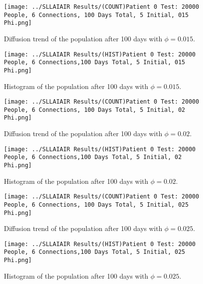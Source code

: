 \documentclass{article}
\numberwithin{equation}{section} %
\begin{document}
\begin{figure}[H]
  \centering
  \begin{minipage}{0.45\textwidth}
    \centering
    \texttt{[image: ../SLLAIAIR Results/(COUNT)Patient 0 Test: 20000 People, 6 Connections, 100 Days Total, 5 Initial, 015 Phi.png]} %
    \caption{Diffusion trend of the population after 100 days with $\phi = 0.015$.}
  \end{minipage}\hfill
  \begin{minipage}{0.45\textwidth}
    \centering
    \texttt{[image: ../SLLAIAIR Results/(HIST)Patient 0 Test: 20000 People, 6 Connections,100 Days Total, 5 Initial, 015 Phi.png]} %
    \caption{Histogram of the population after 100 days with $\phi = 0.015$.}
  \end{minipage}
\end{figure}

\begin{figure}[H]
  \centering
  \begin{minipage}{0.45\textwidth}
    \centering
    \texttt{[image: ../SLLAIAIR Results/(COUNT)Patient 0 Test: 20000 People, 6 Connections, 100 Days Total, 5 Initial, 02 Phi.png]} %
    \caption{Diffusion trend of the population after 100 days with $\phi = 0.02$.}
  \end{minipage}\hfill
  \begin{minipage}{0.45\textwidth}
    \centering
    \texttt{[image: ../SLLAIAIR Results/(HIST)Patient 0 Test: 20000 People, 6 Connections,100 Days Total, 5 Initial, 02 Phi.png]} %
    \caption{Histogram of the population after 100 days with $\phi = 0.02$.}
  \end{minipage}
\end{figure}

\begin{figure}[H]
  \centering
  \begin{minipage}{0.45\textwidth}
    \centering
    \texttt{[image: ../SLLAIAIR Results/(COUNT)Patient 0 Test: 20000 People, 6 Connections, 100 Days Total, 5 Initial, 025 Phi.png]} %
    \caption{Diffusion trend of the population after 100 days with $\phi = 0.025$.}
  \end{minipage}\hfill
  \begin{minipage}{0.45\textwidth}
    \centering
    \texttt{[image: ../SLLAIAIR Results/(HIST)Patient 0 Test: 20000 People, 6 Connections,100 Days Total, 5 Initial, 025 Phi.png]} %
    \caption{Histogram of the population after 100 days with $\phi = 0.025$.}
  \end{minipage}
\end{figure}
\end{document}
